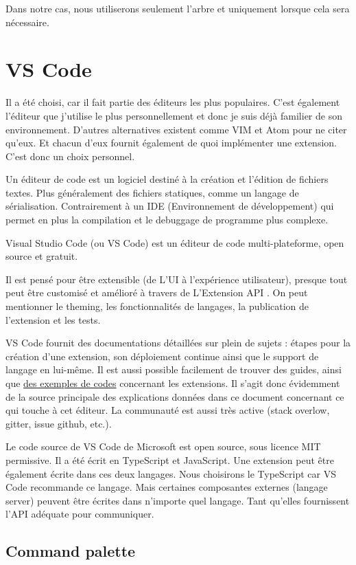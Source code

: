 \documentclass[
    iict, %
    il, %
]{heig-tb}
\begin{document}
Dans notre cas, nous utiliserons seulement l'arbre et uniquement lorsque cela sera nécessaire.

\section{VS Code}
Il a été choisi, car il fait partie des éditeurs les plus populaires. C'est également l'éditeur que j'utilise le plus personnellement et donc je suis déjà familier de son environnement.
D'autres alternatives existent comme VIM et Atom pour ne citer qu'eux. Et chacun d'eux fournit également de quoi implémenter une extension.
C'est donc un choix personnel.

Un éditeur de code est un logiciel destiné à la création et l'édition de fichiers textes. Plus généralement des fichiers statiques, comme un langage de sérialisation. Contrairement à un IDE (Environnement de développement) qui permet en plus la compilation et le debuggage de programme plus complexe.

Visual Studio Code (ou VS Code) est un éditeur de code multi-plateforme, open source et gratuit.

Il est pensé pour être extensible (de L'UI à l'expérience utilisateur), presque tout peut être customisé et amélioré à travers de L'Extension API \cite{extension-api}.
On peut mentionner le theming, les fonctionnalités de langages, la publication de l'extension et les tests.

VS Code fournit des documentations détaillées sur plein de sujets : étapes pour la création d'une extension, son déploiement continue ainsi que le support de langage en lui-même.
Il est aussi possible facilement de trouver des guides, ainsi que \href{https://github.com/microsoft/vscode-extension-samples}{des exemples de codes} concernant les extensions.
Il s'agit donc évidemment de la source principale des explications données dans ce document concernant ce qui touche à cet éditeur.
La communauté est aussi très active (stack overlow, gitter, issue github, etc.).

Le code source de VS Code de Microsoft est open source, sous licence MIT permissive.
Il a été écrit en TypeScript et JavaScript. Une extension peut être également écrite dans ces deux langages.
Nous choisirons le TypeScript car VS Code recommande ce langage. Mais certaines composantes externes (langage server) peuvent être écrites dans n'importe quel langage. Tant qu'elles fournissent l'API adéquate pour communiquer.

\subsection{Command palette}\label{command-palette}
\end{document}
